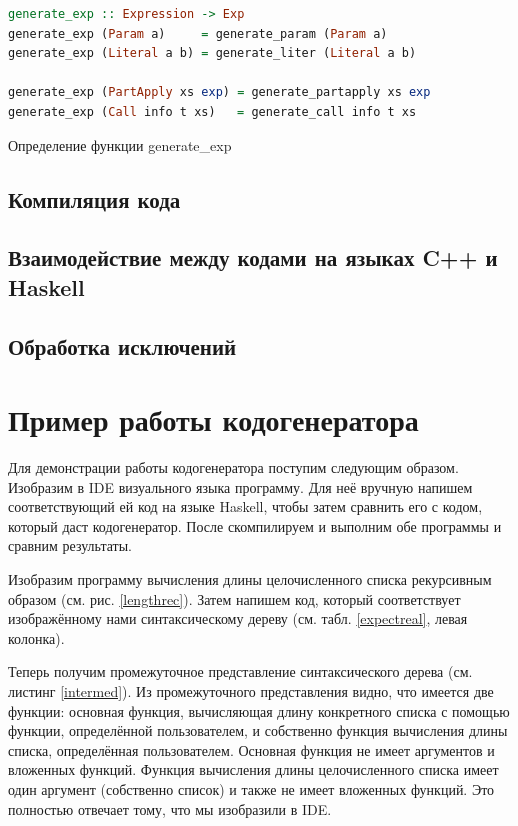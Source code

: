 \begin{ListingEnv}[h]
\begin{lstlisting}[language=Haskell]
generate_exp :: Expression -> Exp
generate_exp (Param a)     = generate_param (Param a)
generate_exp (Literal a b) = generate_liter (Literal a b)

generate_exp (PartApply xs exp) = generate_partapply xs exp
generate_exp (Call info t xs)   = generate_call info t xs
\end{lstlisting}
	\caption{Определение функции generate\_exp}\label{genexp}
\end{ListingEnv}

	\subsection{Компиляция кода}
	\subsection{Взаимодействие между кодами на языках C++ и Haskell}
	\subsection{Обработка исключений}
\section{Пример работы кодогенератора}
Для демонстрации работы кодогенератора поступим следующим образом. Изобразим в IDE визуального языка программу. Для неё вручную напишем соответствующий ей код на языке Haskell, чтобы затем сравнить его с кодом, который даст кодогенератор. После скомпилируем и выполним обе программы и сравним результаты.

Изобразим программу вычисления длины целочисленного списка рекурсивным образом (см. рис. \ref{lengthrec}). Затем напишем код, который соответствует изображённому нами синтаксическому дереву (см. табл. \ref{expectreal}, левая колонка). 

Теперь получим промежуточное представление синтаксического дерева (см. листинг \ref{intermed}). Из промежуточного представления видно, что имеется две функции: основная функция, вычисляющая длину конкретного списка с помощью функции, определённой пользователем, и собственно функция вычисления длины списка, определённая пользователем. Основная функция не имеет аргументов и вложенных функций. Функция вычисления длины целочисленного списка имеет один аргумент (собственно список) и также не имеет вложенных функций. Это полностью отвечает тому, что мы изобразили в IDE.

